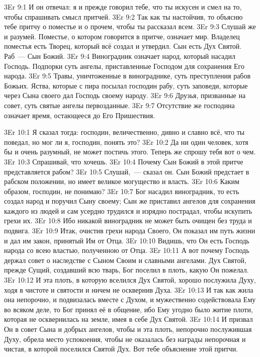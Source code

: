 \vs 3Er 9:1
И он отвечал: я и прежде
говорил тебе, что ты искусен и смел на то, чтобы спрашивать смысл притчей.
\vs 3Er 9:2
Так как ты настойчив, то
объясню тебе притчу о поместье и о прочем, чтобы ты рассказал всем.
\vs 3Er 9:3
Слушай же и разумей.
Поместье, о котором говорится в притче, означает мир. Владелец поместья есть
Творец, который всё создал и утвердил. Сын есть Дух Святой. Раб~--- Сын Божий.
\vs 3Er 9:4
Виноградник означает
народ, который насадил Господь. Подпорки суть ангелы, приставленные Господом
для сохранения Его народа.
\vs 3Er 9:5
Травы, уничтоженные в
винограднике, суть преступления рабов Божьих. Яства, которые с пира посылал
господин рабу, суть заповеди, которые через Сына своего дал Господь своему
народу.
\vs 3Er 9:6
Друзья, призванные на
совет, суть святые ангелы первозданные.
\vs 3Er 9:7
Отсутствие же господина
означает время, остающееся до Его Пришествия.

\vs 3Er 10:1
Я сказал тогда: господин,
величественно, дивно и славно всё, что ты поведал, но мог ли я, господин,
понять это?
\vs 3Er 10:2
Да ни один человек, хотя
бы и очень разумный, не может постичь этого. Теперь же спрошу тебя вот о чем.
\vs 3Er 10:3
Спрашивай, что хочешь.
\vs 3Er 10:4
Почему Сын Божий в этой
притче представляется рабом?
\vs 3Er 10:5
Слушай,~--- сказал он. Сын
Божий предстает в рабском положении, но имеет великое могущество и власть.
\vs 3Er 10:6
Каким образом, господин,
не понимаю?
\vs 3Er 10:7
Бог насадил виноградник,
то есть создал народ и поручил Сыну своему; Сын же приставил ангелов для
сохранения каждого из людей и сам усердно трудился и изрядно пострадал, чтобы
искупить грехи их.
\vs 3Er 10:8
Ибо никакой виноградник не
может быть очищен без труда и подвига.
\vs 3Er 10:9
Итак, очистив грехи народа
Своего, Он показал им путь жизни и дал им закон, принятый Им от Отца.
\vs 3Er 10:10
Видишь, что Он есть
Господь народа со всею властью, полученною от Отца.
\vs 3Er 10:11
А вот почему Господь
держал совет о наследстве с Сыном Своим и славными ангелами. Дух Святой,
прежде Сущий, создавший всю тварь, Бог поселил в плоть, какую Он пожелал.
\vs 3Er 10:12
И эта плоть, в которую
вселился Дух Святой, хорошо послужила Духу, ходя в чистоте и святости и ничем
не осквернив Духа.
\vs 3Er 10:13
И так как жила она
непорочно, и подвизалась вместе с Духом, и мужественно содействовала Ему во
всяком деле, то Бог принял её в общение, ибо Ему угодно было житие плоти,
которая не осквернилась на земле, имея в себе Дух Святой.
\vs 3Er 10:14
И призвал Он в совет Сына
и добрых ангелов, чтобы и эта плоть, непорочно послужившая Духу, обрела место
успокоения, чтобы не оказалась без награды непорочная и чистая, в которой
поселился Святой Дух. Вот тебе объяснение этой притчи.

